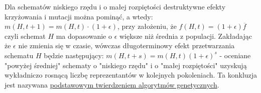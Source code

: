 Dla schematów niskiego rzędu i o małej rozpiętości  destruktywne efekty krzyżowania i mutacji można pominąć, a wtedy:\newline
$ m(H, t+1) = m(H, t) \cdot (1+ \epsilon ) $, przy założeniu, że $ f(H, t) = (1+ \epsilon )\overline{f} $ czyli schemat $ H $ ma dopasowanie o $ \epsilon $ większe niż średnia z populacji. Zakładając że $ \epsilon $ nie zmienia się w czasie, wówczas długoterminowy efekt przetwarzania schematu $ H $ będzie następujący:\newline
$ m(H, t+s) = m(H, t)(1 + \epsilon)^s $ - oceniane "powyżej średniej" schematy o "niskiego rzędu" i o "małej rozpiętości" uzyskują wykładniczo rosnącą liczbę reprezentantów w kolejnych pokoleniach. Ta konkluzja jest nazywana \underline{podstawowym twierdzeniem algorytmów genetycznych}.